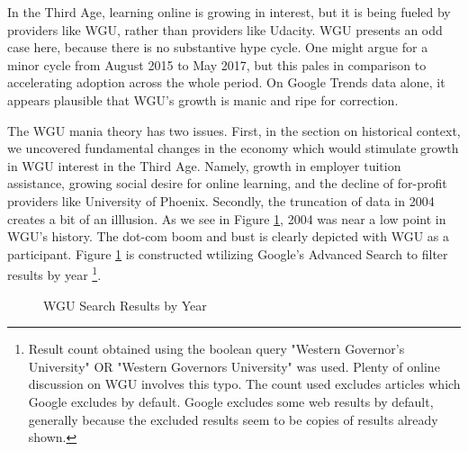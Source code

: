 \documentclass[review]{elsarticle}
\begin{document}
    In the Third Age, learning online is growing in interest, but it is being fueled by providers
    like WGU, rather than providers like Udacity.
    WGU presents an odd case here, because there is no substantive hype cycle.
    One might argue for a minor cycle from August 2015 to May 2017, but this pales in comparison to accelerating adoption across the whole period.
    On Google Trends data alone, it appears plausible that WGU's growth is manic and ripe for correction.

    The WGU mania theory has two issues.
    First, in the section on historical context, we uncovered fundamental changes in the economy which would stimulate growth in WGU interest in the Third Age.
    Namely, growth in employer tuition assistance, growing social desire for online learning,
    and the decline of for-profit providers like University of Phoenix.
    Secondly, the truncation of data in 2004 creates a bit of an illlusion.
    As we see in Figure \ref{fig:wgu_search_results}, 2004 was near a low point in WGU's history.
    The dot-com boom and bust is clearly depicted with WGU as a participant.
    Figure \ref{fig:wgu_search_results} is constructed wtilizing Google's Advanced Search to filter results by year
    \footnote{
        Result count obtained using the boolean query "Western Governor's University" OR "Western Governors University" was used.
        Plenty of online discussion on WGU involves this typo.
        The count used excludes articles which Google excludes by default.
        Google excludes some web results by default, generally because the excluded results seem to be copies of results already shown.
    }.

    \begin{figure}[h!]
        \centering
        \caption{WGU Search Results by Year}
    

        \label{fig:wgu_search_results}
        \end{figure}
    
\end{document}
